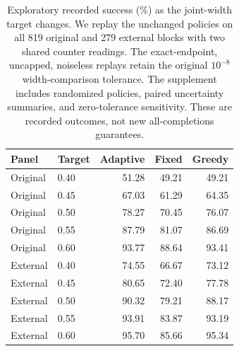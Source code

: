 \begin{table}[htbp]
\centering\small
\begin{tabular}{llrrr}
\toprule
Panel & Target & Adaptive & Fixed & Greedy\\
\midrule
Original & 0.40 & 51.28 & 49.21 & 49.21\\
Original & 0.45 & 67.03 & 61.29 & 64.35\\
Original & 0.50 & 78.27 & 70.45 & 76.07\\
Original & 0.55 & 87.79 & 81.07 & 86.69\\
Original & 0.60 & 93.77 & 88.64 & 93.41\\
External & 0.40 & 74.55 & 66.67 & 73.12\\
External & 0.45 & 80.65 & 72.40 & 77.78\\
External & 0.50 & 90.32 & 79.21 & 88.17\\
External & 0.55 & 93.91 & 83.87 & 93.19\\
External & 0.60 & 95.70 & 85.66 & 95.34\\
\bottomrule
\end{tabular}
\caption{Exploratory recorded success (\%) as the joint-width target changes. We replay the unchanged policies on all 819 original and 279 external blocks with two shared counter readings. The exact-endpoint, uncapped, noiseless replays retain the original $10^{-8}$ width-comparison tolerance. The supplement includes randomized policies, paired uncertainty summaries, and zero-tolerance sensitivity. These are recorded outcomes, not new all-completions guarantees.}
\label{tab:joint_threshold_sensitivity}
\end{table}
